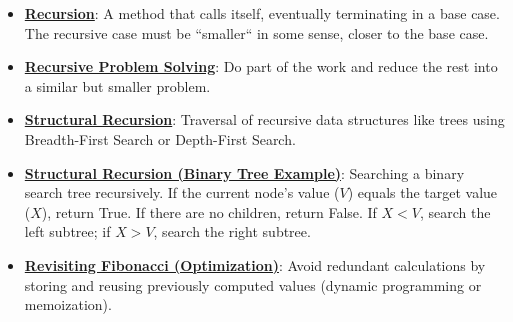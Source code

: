 \documentclass{article}%
\begin{document}
\begin{itemize}[leftmargin=*]%
\item \href{https://purdue.brightspace.com/d2l/common/assets/pdfjs-d2l-dist/1.0.14-legacy/web/viewer.html?file=\%2Fcontent\%2Fenforced\%2F1095467-wl.202510.CS.24300.001\%2F14L1-DepthFS.pdf\%3Fou\%3D1095467\&lang=en-us\&container=d2l-fileviewer-rendered-pdf\&fullscreen=d2l-fileviewer-rendered-pdf-dialog\&height=667#page=3}{\textbf{Recursion}}: A method that calls itself, eventually terminating in a base case. The recursive case must be ``smaller`` in some sense, closer to the base case.%
\item \href{https://purdue.brightspace.com/d2l/common/assets/pdfjs-d2l-dist/1.0.14-legacy/web/viewer.html?file=\%2Fcontent\%2Fenforced\%2F1095467-wl.202510.CS.24300.001\%2F14L1-DepthFS.pdf\%3Fou\%3D1095467\&lang=en-us\&container=d2l-fileviewer-rendered-pdf\&fullscreen=d2l-fileviewer-rendered-pdf-dialog\&height=667#page=4}{\textbf{Recursive Problem Solving}}: Do part of the work and reduce the rest into a similar but smaller problem.%
\item \href{https://purdue.brightspace.com/d2l/common/assets/pdfjs-d2l-dist/1.0.14-legacy/web/viewer.html?file=\%2Fcontent\%2Fenforced\%2F1095467-wl.202510.CS.24300.001\%2F14L1-DepthFS.pdf\%3Fou\%3D1095467\&lang=en-us\&container=d2l-fileviewer-rendered-pdf\&fullscreen=d2l-fileviewer-rendered-pdf-dialog\&height=667#page=8}{\textbf{Structural Recursion}}: Traversal of recursive data structures like trees using Breadth-First Search or Depth-First Search.%
\item \href{https://purdue.brightspace.com/d2l/common/assets/pdfjs-d2l-dist/1.0.14-legacy/web/viewer.html?file=\%2Fcontent\%2Fenforced\%2F1095467-wl.202510.CS.24300.001\%2F14L1-DepthFS.pdf\%3Fou\%3D1095467\&lang=en-us\&container=d2l-fileviewer-rendered-pdf\&fullscreen=d2l-fileviewer-rendered-pdf-dialog\&height=667#page=10}{\textbf{Structural Recursion (Binary Tree Example)}}: Searching a binary search tree recursively. If the current node's value ($V$) equals the target value ($X$), return True. If there are no children, return False. If $X < V$, search the left subtree; if $X > V$, search the right subtree.%
\item \href{https://purdue.brightspace.com/d2l/common/assets/pdfjs-d2l-dist/1.0.14-legacy/web/viewer.html?file=\%2Fcontent\%2Fenforced\%2F1095467-wl.202510.CS.24300.001\%2F14L1-DepthFS.pdf\%3Fou\%3D1095467\&lang=en-us\&container=d2l-fileviewer-rendered-pdf\&fullscreen=d2l-fileviewer-rendered-pdf-dialog\&height=667#page=21}{\textbf{Revisiting Fibonacci (Optimization)}}: Avoid redundant calculations by storing and reusing previously computed values (dynamic programming or memoization).%
\end{itemize}%
\end{document}
